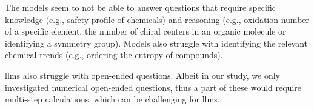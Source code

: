 The models seem to not be able to answer questions that require specific knowledge (e.g., safety profile of chemicals) and reasoning (e.g., oxidation number of a specific element, the number of chiral centers in an organic molecule or identifying a symmetry group).
Models also struggle with identifying the relevant chemical trends (e.g., ordering the entropy of compounds).

\glspl{llm} also struggle with open-ended questions. Albeit in our study, we only investigated numerical open-ended questions, thus a part of these would require multi-step calculations, which can be challenging for \glspl{llm}.\autocite{zhou2023llm_arithmetics}